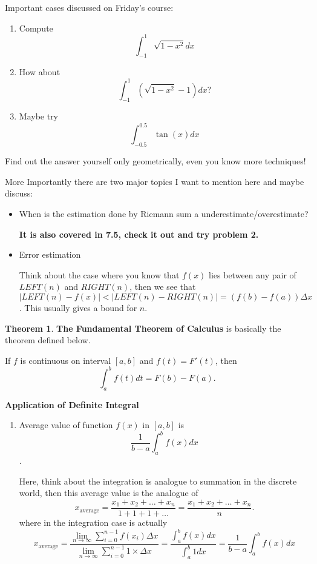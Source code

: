 \documentclass[12pt]{article}
\theoremstyle{definition}
\newtheorem{thm}{Theorem}[section]
\theoremstyle{definition}
\theoremstyle{remark}
\theoremstyle{definition}
\theoremstyle{definition}
\theoremstyle{definition}
\begin{document}
Important cases discussed on Friday's course:
\begin{enumerate}
	\item Compute \[\int^{1}_{-1}\sqrt{1-x^2}dx\]
	\item How about \[\int^{1}_{-1}(\sqrt{1-x^2}-1)dx?\]
	\item Maybe try\[\int^{0.5}_{-0.5}\tan(x)dx\]
\end{enumerate}

Find out the answer yourself only geometrically, even you know more techniques!



More Importantly there are two major topics I want to mention here and maybe discuss:

\begin{itemize}
	\item When is the estimation done by Riemann sum a underestimate/overestimate?
	
\textbf{It is also covered in 7.5, check it out and try problem 2.}
	
	\item Error estimation
	
	Think about the case where you know that $f(x)$ lies between any pair of $LEFT(n)$ and $RIGHT(n)$, then we see that $|LEFT(n) - f(x)|<|LEFT(n)-RIGHT(n)|=(f(b)-f(a))\Delta x$. This usually gives a bound for $n$.
\end{itemize}

\hrulefill
\begin{thm}
\textbf{The Fundamental Theorem of Calculus} is basically the theorem defined below.

If $f$ is continuous on interval $[a,b]$ and $f(t)=F'(t)$, then \[\int^b_a f(t) dt = F(b)-F(a).\]
\end{thm}
\hrulefill

\textbf{Application of Definite Integral}

\begin{enumerate}
	\item Average value of function $f(x)$ in $[a,b]$ is \[\frac{1}{b-a} \int_{a}^{b}f(x)dx\].
	
	Here, think about the integration is analogue to summation in the discrete world, then this average value is the analogue of \[x_{\text{average}}=\frac{x_1+x_2+\ldots+x_n}{1+1+1+\dots}=\frac{x_1+x_2+\ldots+x_n}{n}.\] where in the integration case is actually \[x_{\text{average}}=\frac{\lim_{n\rightarrow \infty} \sum_{i=0}^{n-1} f(x_i)\Delta x}{\lim_{n\rightarrow \infty} \sum_{i=0}^{n-1} 1 \times \Delta x}=\frac{\int_{a}^{b}f(x)dx}{\int_{a}^{b}1 dx}=\frac{1}{b-a} \int_{a}^{b}f(x)dx\]
\end{enumerate}
\end{document}
